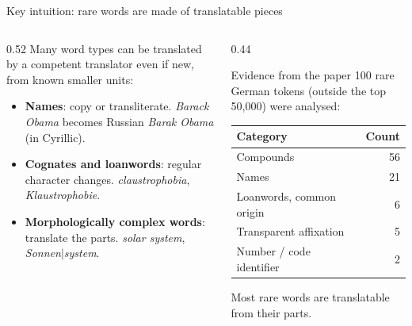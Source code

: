 \documentclass[aspectratio=169,11pt]{beamer}
\begin{document}
\begin{frame}{Key intuition: rare words are made of translatable pieces}
  \begin{columns}[T]
    \begin{column}{0.52\textwidth}
      \small
      Many word types can be translated by a competent translator even if new, from known smaller units:
      \begin{itemize}
        \item \textbf{Names}: copy or transliterate. \emph{Barack Obama} becomes Russian \emph{Barak Obama} (in Cyrillic).
        \item \textbf{Cognates and loanwords}: regular character changes. \emph{claustrophobia}, \emph{Klaustrophobie}.
        \item \textbf{Morphologically complex words}: translate the parts. \emph{solar system}, \emph{Sonnen$|$system}.
      \end{itemize}
    \end{column}
    \begin{column}{0.44\textwidth}
      \begin{block}{Evidence from the paper}
        \small
        100 rare German tokens (outside the top 50,000) were analysed:
        \vspace{1mm}

        \begin{tabular}{@{}lr@{}}
          \toprule
          Category & Count\\
          \midrule
          Compounds & 56\\
          Names & 21\\
          Loanwords, common origin & 6\\
          Transparent affixation & 5\\
          Number / code identifier & 2\\
          \bottomrule
        \end{tabular}
        \vspace{1mm}

        Most rare words are translatable from their parts.
      \end{block}
    \end{column}
  \end{columns}
\end{frame}
\end{document}
